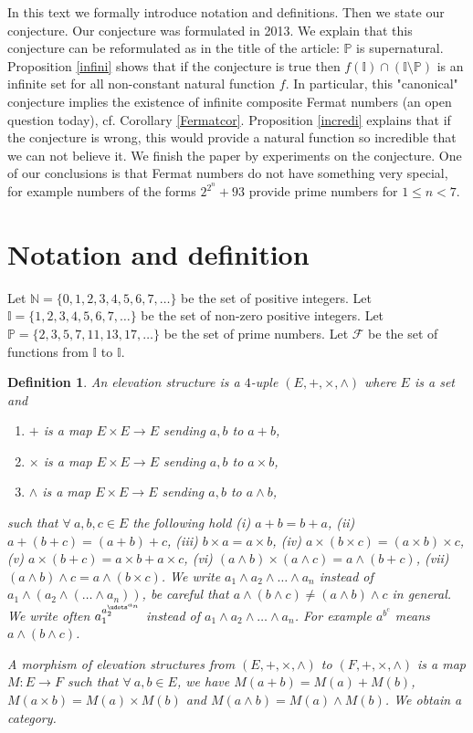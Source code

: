 \documentclass{alggeom}
\renewcommand{\leq}{\leqslant}
\newtheorem{defi}[theo]{Definition}
\newcommand{\N}{\mathbb{N}}
\newcommand{\I}{\mathbb{I}}
\newcommand{\pp}{\mathbb{P}}
\begin{document}
 In this text we formally introduce notation and definitions. Then we state our conjecture. Our conjecture was formulated in 2013. We explain that this conjecture can be reformulated as in the title of the article: $\pp$ is supernatural. Proposition \ref{infini} shows that if the conjecture is true then $f(\I) \cap (\I \setminus \pp )$ is an infinite set for all non-constant natural function $f$. In particular, this "canonical" conjecture implies the existence of infinite composite Fermat numbers (an open question today), cf. Corollary \ref{Fermatcor}. Proposition \ref{incredi} explains that if the conjecture is wrong, this would provide a natural function so incredible that we can not believe it. We finish the paper by experiments on the conjecture. One of our conclusions is that Fermat numbers do not have something very special, for example numbers of the forms $2^{2^n}+93$ provide prime numbers for $1 \leq n <7$.

\section{Notation and definition}
\begin{sloppypar}
Let $\N = \{0,1,2,3,4,5,6,7, \ldots \} $ be the set of positive integers.
Let $\I=\{1,2,3,4,5,6,7, \ldots\} $ be the set of non-zero positive integers.  Let $ \pp =\{2,3,5,7,11,13,17,\ldots\} $ be the set of prime numbers. Let $\mathscr{F}$ be the set of functions from $\I$ to $\I$. \end{sloppypar}

\begin{defi}An elevation structure is a $4$-uple $(E,+,\times , \wedge )$ where $E$ is a set and \begin{enumerate}
\item $+$ is a map $E \times E \to E$ sending $a,b$ to $a+b$,
\item $\times $ is a map $E \times E \to E$ sending $a,b$ to $a \times b$,
\item $\wedge $ is a map $E \times E \to E $ sending $a,b $ to $a \wedge b $,
\end{enumerate}
such that $\forall ~ a,b,c \in E$ the following hold 
(i) $a+b=b+a$,
(ii) $a+(b+c)=(a+b)+c$,
(iii) $b \times a = a \times b $,
(iv) $a\times (b \times c ) = (a \times b ) \times c $,
(v) $ a \times (b+c) = a \times b + a \times c $,
(vi) $(a \wedge b ) \times (a \wedge c) = a \wedge ({b+c})$,
(vii) $(a \wedge b ) \wedge c = a \wedge ( b \times c )$.
 We write $a_1 \wedge a_2 \wedge \ldots  \wedge a_n $ instead of $a_1 \wedge (a_2 \wedge (\ldots \wedge a_n))$, be careful that $a \wedge ( b \wedge c ) \ne ( a \wedge b ) \wedge c $ in general. We  write often $a_1^{a_2^{\udots ^{a_n}}}$ instead of $a_1 \wedge a_2 \wedge \ldots  \wedge a_n $. For example $a^{b^c}$ means $a \wedge (b \wedge c )$.


 
 A morphism of elevation structures from $(E,+, \times , \wedge ) $ to $(F ,+, \times , \wedge )$ is a map $M:E \to F$ such that $\forall ~a,b \in E$, we have $M (a+b) = M (a) + M (b)$, $~$ $M(a \times b) = M (a) \times M (b)$ and $M (a \wedge b) = M (a) \wedge M (b)$. We obtain a category.
\end{defi}
\end{document}
